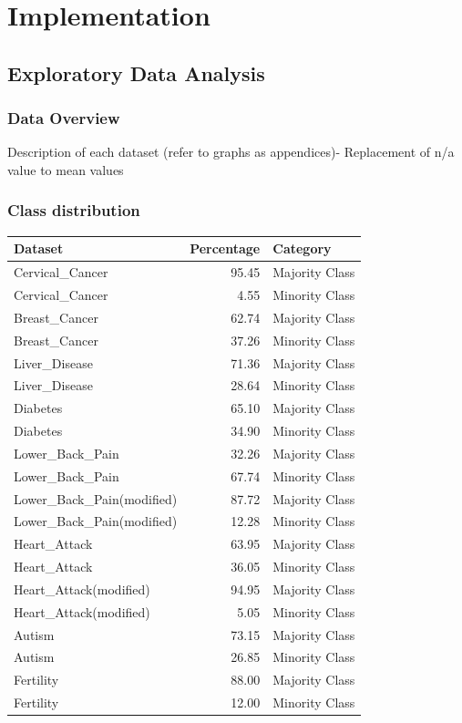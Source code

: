 \chapter{Implementation}\label{ch:Implementation}

\section{Exploratory Data Analysis}
\subsection{Data Overview}
Description of each dataset (refer to graphs as appendices)- Replacement of n/a value to mean values

\subsection{Class distribution}


\begin{table}[ht]
\centering
\begin{tabular}{lrl}
  \hline
Dataset & Percentage & Category \\ 
  \hline
Cervical\_Cancer & 95.45 & Majority Class \\ 
  Cervical\_Cancer & 4.55 & Minority Class \\ 
  Breast\_Cancer & 62.74 & Majority Class \\ 
  Breast\_Cancer & 37.26 & Minority Class \\ 
  Liver\_Disease & 71.36 & Majority Class \\ 
  Liver\_Disease & 28.64 & Minority Class \\ 
  Diabetes & 65.10 & Majority Class \\ 
  Diabetes & 34.90 & Minority Class \\ 
  Lower\_Back\_Pain & 32.26 & Majority Class \\ 
  Lower\_Back\_Pain & 67.74 & Minority Class \\ 
  Lower\_Back\_Pain(modified) & 87.72 & Majority Class \\ 
  Lower\_Back\_Pain(modified) & 12.28 & Minority Class \\ 
  Heart\_Attack & 63.95 & Majority Class \\ 
  Heart\_Attack & 36.05 & Minority Class \\ 
  Heart\_Attack(modified) & 94.95 & Majority Class \\ 
  Heart\_Attack(modified) & 5.05 & Minority Class \\ 
  Autism & 73.15 & Majority Class \\ 
  Autism & 26.85 & Minority Class \\ 
  Fertility & 88.00 & Majority Class \\ 
  Fertility & 12.00 & Minority Class \\ 
   \hline
\end{tabular}
\end{table}

